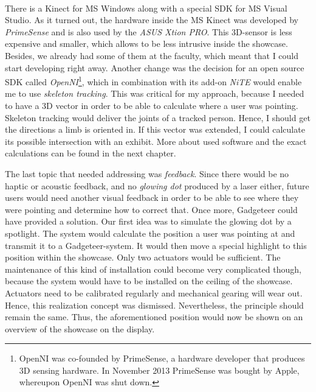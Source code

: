 \\
There is a Kinect for \ac{MS} Windows along with a special \ac{SDK} for \ac{MS} Visual Studio. As it turned out, the hardware inside the \ac{MS} Kinect was developed by \textit{PrimeSense} and is also used by the \textit{ASUS Xtion PRO}. This \ac{3D}-sensor is less expensive and smaller, which allows to be less intrusive inside the showcase. Besides, we already had some of them at the faculty, which meant that I could start developing right away. Another change was the decision for an open source \ac{SDK} called \textit{OpenNI}\footnote{OpenNI was co-founded by PrimeSense, a hardware developer that produces \ac{3D} sensing hardware. In November 2013 PrimeSense was bought by Apple, whereupon OpenNI was shut down.}, which in combination with its add-on \textit{NiTE} would enable me to use \textit{skeleton tracking}. This was critical for my approach, because I needed to have a \ac{3D} vector in order to be able to calculate where a user was pointing. Skeleton tracking would deliver the joints of a tracked person. Hence, I should get the directions a limb is oriented in. If this vector was extended, I could calculate its possible intersection with an exhibit. More about used software and the exact calculations can be found in the next chapter.

The last topic that needed addressing was \textit{feedback}. Since there would be no haptic or acoustic feedback, and no \textit{glowing dot} produced by a laser either, future users would need another visual feedback in order to be able to see where they were pointing and determine how to correct that. Once more, Gadgeteer could have provided a solution. Our first idea was to simulate the glowing dot by a spotlight. The system would calculate the position a user was pointing at and transmit it to a Gadgeteer-system. It would then move a special highlight to this position within the showcase. Only two actuators would be sufficient. The maintenance of this kind of installation could become very complicated though, because the system would have to be installed on the ceiling of the showcase. Actuators need to be calibrated regularly and mechanical gearing will wear out. Hence, this realization concept was dismissed. Nevertheless, the principle should remain the same. Thus, the aforementioned position would now be shown on an overview of the showcase on the display.

%

